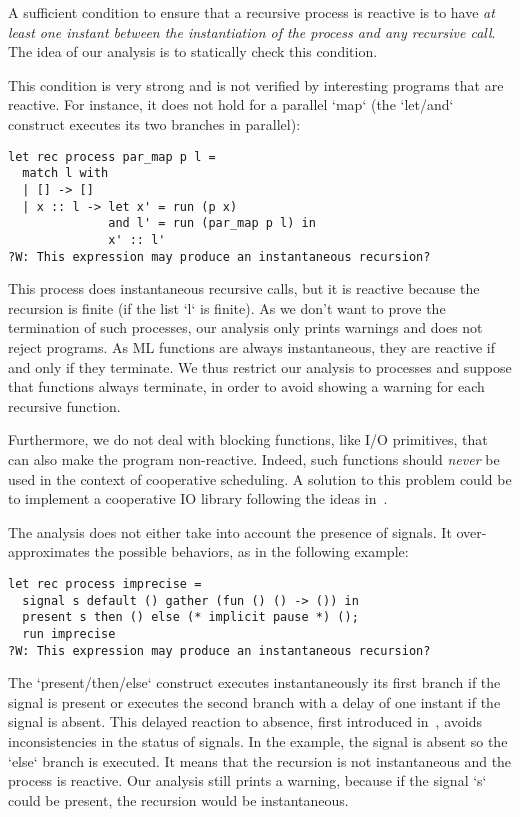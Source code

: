 \documentclass[9pt,preprint]{sigplanconf}
\begin{document}
A sufficient condition to ensure that a recursive process is reactive is to have \emph{at least one instant between the instantiation of the process and any recursive call}. The idea of our analysis is to statically check this condition.

This condition is very strong and is not verified by interesting programs that are reactive. For instance, it does not hold for a parallel `map` (the `let/and` construct executes its two branches in parallel):
\begin{lstlisting}
let rec process par_map p l =
  match l with
  | [] -> []
  | x :: l -> let x' = run (p x)
              and l' = run (par_map p l) in
              x' :: l'
?W: This expression may produce an instantaneous recursion?
\end{lstlisting}
This process does instantaneous recursive calls, but it is reactive because the recursion is finite (if the list `l` is finite). As we don't want to prove the termination of such processes, our analysis only prints warnings and does not reject programs.
As ML functions are always instantaneous, they are reactive if and only if they terminate. %
We thus restrict our analysis to processes and suppose that functions always terminate, in order to avoid showing a warning for each recursive function.

Furthermore, we do not deal with blocking functions, like I/O primitives, that can also make the program non-reactive. Indeed, such functions should \emph{never} be used in the context of cooperative scheduling. A solution to this problem could be to implement a cooperative IO library following the ideas in~\cite{Marlow:2004}.

The analysis does not either take into account the presence of signals. It over-approximates the possible behaviors, as in the following example:
\begin{lstlisting}
let rec process imprecise =
  signal s default () gather (fun () () -> ()) in
  present s then () else (* implicit pause *) ();
  run imprecise
?W: This expression may produce an instantaneous recursion?
\end{lstlisting}
%
The `present/then/else` construct executes instantaneously its first branch if the signal is present or executes the second branch with a delay of one instant if the signal is absent. This delayed reaction to absence, first introduced in~\cite{Boussinot:1991}, avoids inconsistencies in the status of signals. In the example, the signal is absent so the `else` branch is executed. It means that the recursion is not instantaneous and the process is reactive. Our analysis still prints a warning, because if the signal `s` could be present, the recursion would be instantaneous.
\end{document}
